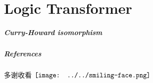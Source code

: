 \documentclass[10pt]{beamer}
\newcommand{\cc}[2]{#1}
\newcommand{\cc}[2]{#2}
\newcommand{\smiley}{$\vcenter{\hbox{\texttt{[image: ../../smiling-face.png]}}}$}
\begin{document}
\part{Logic Transformer}
\frame{\partpage}

\begin{frame}
\frametitle{Curry-Howard isomorphism}
\end{frame}

\begin{frame}
\frametitle{References}
\cc{多谢收看}{Thanks for watching} \smiley \vspace{1cm}
\printbibliography
\end{frame}
\end{document}
